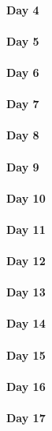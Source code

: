\documentclass[UTF8,a4paper,8pt]{ctexart}
\begin{document}
 	 \paragraph{Day 4       \quad     }
 	 \paragraph{Day 5       \quad     }
 	 \paragraph{Day 6       \quad     }
 	 \paragraph{Day 7       \quad     }
 	 \paragraph{Day 8       \quad     }
 	 \paragraph{Day 9       \quad     }
 	 \paragraph{Day 10      \quad     }
 	 \paragraph{Day 11      \quad     }
 	 \paragraph{Day 12      \quad     }
 	 \paragraph{Day 13      \quad     }
 	 \paragraph{Day 14      \quad     }
 	 \paragraph{Day 15      \quad     }
 	 \paragraph{Day 16      \quad     }
 	 \paragraph{Day 17      \quad     }
\end{document}
